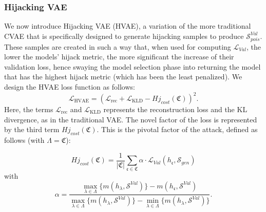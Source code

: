 \subsubsection{Hijacking VAE}
\label{subsub:hvae}
We now introduce Hijacking VAE (HVAE), a variation of the more traditional CVAE that is specifically designed to generate hijacking samples to produce $\mathcal{S}^{Val}_{pois}$.
These samples are created in such a way that, when used for computing $\mathcal{L}_{Val}$, the lower the models' hijack metric, the more significant the increase of their validation loss, hence swaying the model selection phase into returning the model that has the highest hijack metric (which has been the least penalized).
We design the HVAE loss function as follows:
    \begin{equation}
        \label{lossMHVAE}
 \mathcal{L}_{\mathrm{HVAE}} = (\mathcal{L}_{\mathrm{rec}} + \mathcal{L}_{\mathrm{KLD}} - Hj_{cost}(\mathfrak{C})) ^ 2.
    \end{equation}
Here, the terms $\mathcal{L}_{\mathrm{rec}}$ and $\mathcal{L}_{\mathrm{KLD}}$ represents the reconstruction loss and the KL divergence, as in the traditional VAE. 
The novel factor of the loss is represented by the third term $Hj_{cost}(\mathfrak{C})$.
This is the pivotal factor of the attack, defined as follows (with $\Lambda = \mathfrak{C}$):

\begin{equation} \label{cost}
     Hj_{cost}(\mathfrak{C}) = \frac{1}{|\mathfrak{C}|}\sum_{\mathfrak{c} \in \mathfrak{C}} \alpha \cdot \mathcal{L}_{Val}(h_{\mathfrak{c}}, \mathcal{S}_{gen})
\end{equation}
with 
\begin{equation} \label{alpha}
 \alpha = \frac
     {\underset{\lambda \in \Lambda}{\max} \{m(h_{\lambda}, \mathcal{S}^{Val})\} - m(h_ {\mathfrak{c}}, \mathcal{S}^{Val})}
     {\underset{\lambda \in \Lambda}{\max} \{m(h_{\lambda}, \mathcal{S}^{Val})\} - \underset{\lambda \in \Lambda}{\min} \{m(h_{\lambda}, \mathcal{S}^{Val})\}}. 
\end{equation}
 
